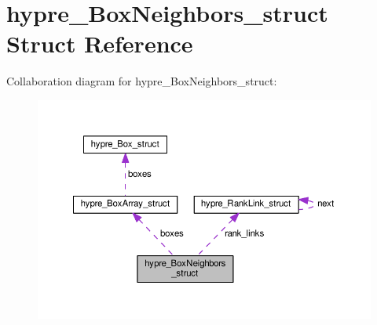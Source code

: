 \hypertarget{structhypre__BoxNeighbors__struct}{}\section{hypre\+\_\+\+Box\+Neighbors\+\_\+struct Struct Reference}
\label{structhypre__BoxNeighbors__struct}


Collaboration diagram for hypre\+\_\+\+Box\+Neighbors\+\_\+struct\+:
\nopagebreak
\begin{figure}[H]
\begin{center}
\leavevmode
\includegraphics[width=350pt]{structhypre__BoxNeighbors__struct__coll__graph}
\end{center}
\end{figure}
